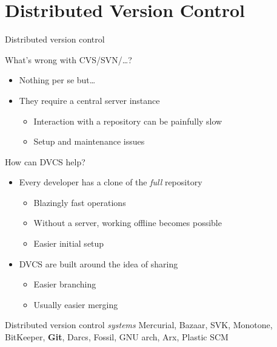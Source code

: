 \documentclass[18pt]{beamer}
\begin{document}
\section{Distributed Version Control}

\begin{frame}{Distributed version control}
  \begin{block}{What's wrong with CVS/SVN/\ldots?}
    \begin{itemize}
      \item Nothing per se but\ldots
      \item They require a central server instance
        \begin{itemize}
          \item Interaction with a repository can be painfully slow
          \item Setup and maintenance issues
        \end{itemize}
    \end{itemize}
  \end{block}

  \begin{block}{How can DVCS help?}
    \begin{itemize}
      \item Every developer has a clone of the \emph{full} repository
        \begin{itemize}
          \item Blazingly fast operations
          \item Without a server, working offline becomes possible
          \item Easier initial setup
        \end{itemize}
      \item DVCS are built around the idea of sharing
        \begin{itemize}
          \item Easier branching
          \item Usually easier merging
        \end{itemize}
    \end{itemize}
  \end{block}
\end{frame}
\begin{frame}{Distributed version control \emph{systems}}
  Mercurial, Bazaar, SVK, Monotone, BitKeeper, \textbf{Git}, Darcs, Fossil, GNU
  arch, Arx, Plastic SCM
\end{frame}
\end{document}
